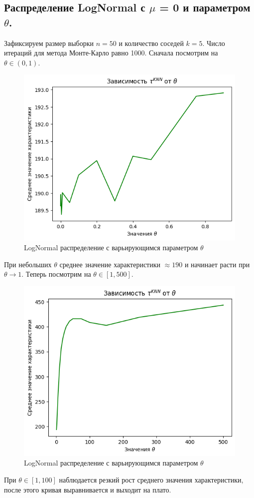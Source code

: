 \documentclass{report}
\begin{document}
\subsection{Распределение LogNormal с $\mu$ = 0 и параметром $\theta$.}
Зафиксируем размер выборки $n = 50$ и количество соседей $k = 5$. Число итераций для метода Монте-Карло равно 1000.
\newline
\newline
Сначала посмотрим на $\theta \in (0, 1).$
\begin{figure}[h]
    \centering
    \includegraphics[width=0.5\linewidth]{1.png}
    \caption{LogNormal распределение с варьирующимся параметром $\theta$}
\end{figure}
\newline
\newline
При небольших $\theta$ среднее значение характеристики $\approx 190$ и начинает расти при $\theta \longrightarrow 1$.
\newline
\newline
Теперь посмотрим на $\theta \in [1, 500].$
\begin{figure}[h]
    \centering
    \includegraphics[width=0.5\linewidth]{2.png}
    \caption{LogNormal распределение с варьирующимся параметром $\theta$}
\end{figure}
\newline
\newline
При $\theta \in [1, 100]$ наблюдается резкий рост среднего значения характеристики, после этого кривая выравнивается и выходит на плато.
\end{document}
